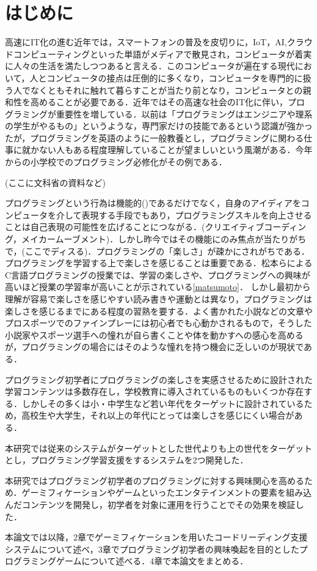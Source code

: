\section{はじめに}

高速にIT化の進む近年では，スマートフォンの普及を皮切りに，IoT，AI,クラウドコンピューティングといった単語がメディアで散見され，コンピュータが着実に人々の生活を満たしつつあると言える．このコンピュータが遍在する現代において，人とコンピュータの接点は圧倒的に多くなり，コンピュータを専門的に扱う人でなくともそれに触れて暮らすことが当たり前となり，コンピュータとの親和性を高めることが必要である．近年ではその高速な社会のIT化に伴い，プログラミングが重要性を増している．以前は「プログラミングはエンジニアや理系の学生がやるもの」というような，専門家だけの技能であるという認識が強かったが，プログラミングを英語のように一般教養とし，プログラミングに関わる仕事に就かない人もある程度理解していることが望ましいという風潮がある．今年からの小学校でのプログラミング必修化がその例である．

(ここに文科省の資料など)

プログラミングという行為は機能的()であるだけでなく，自身のアイディアをコンピュータを介して表現する手段でもあり，プログラミングスキルを向上させることは自己表現の可能性を広げることにつながる．(クリエイティブコーディング，メイカームーブメント)．しかし昨今ではその機能にのみ焦点が当たりがちで，(ここでディスる)．プログラミングの「楽しさ」が疎かにされがちである．プログラミングを学習する上で楽しさを感じることは重要である．松本らによるC言語プログラミングの授業では、学習の楽しさや、プログラミングへの興味が高いほど授業の学習率が高いことが示されている\ref{matsumoto}．
しかし最初から理解が容易で楽しさを感じやすい読み書きや運動とは異なり，プログラミングは楽しさを感じるまでにある程度の習熟を要する．よく書かれた小説などの文章やプロスポーツでのファインプレーには初心者でも心動かされるもので，そうした小説家やスポーツ選手への憧れが自ら書くことや体を動かすへの感心を高めるが，プログラミングの場合にはそのような憧れを持つ機会に乏しいのが現状である．

プログラミング初学者にプログラミングの楽しさを実感させるために設計された学習コンテンツは多数存在し，学校教育に導入されているものもいくつか存在する．しかしその多くは小・中学生など若い年代をターゲットに設計されているため，高校生や大学生，それ以上の年代にとっては楽しさを感じにくい場合がある．

本研究では従来のシステムがターゲットとした世代よりも上の世代をターゲットとし，プログラミング学習支援をするシステムを2つ開発した．

本研究ではプログラミング初学者のプログラミングに対する興味関心を高めるため．ゲーミフィケーションやゲームといったエンタテインメントの要素を組み込んだコンテンツを開発し，初学者を対象に運用を行うことでその効果を検証した．

本論文では以降，2章でゲーミフィケーションを用いたコードリーディング支援システムについて述べ，3章でプログラミング初学者の興味喚起を目的としたプログラミングゲームについて述べる．4章で本論文をまとめる．